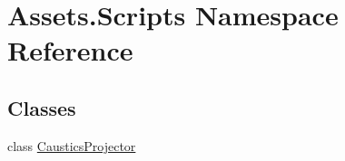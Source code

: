 \hypertarget{namespace_assets_1_1_scripts}{}\section{Assets.\+Scripts Namespace Reference}
\label{namespace_assets_1_1_scripts}
\subsection*{Classes}
\begin{DoxyCompactItemize}
\item 
class \hyperlink{class_assets_1_1_scripts_1_1_caustics_projector}{Caustics\+Projector}
\end{DoxyCompactItemize}
